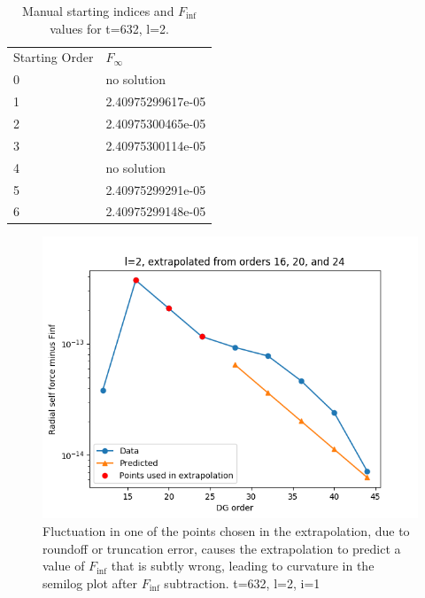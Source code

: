 \begin{table}
  \begin{tabular}{ll}
    Starting Order & $F_\infty$\\
    0 & no solution\\
    1 & 2.40975299617e-05\\
    2 & 2.40975300465e-05\\
    3 & 2.40975300114e-05\\
    4 & no solution\\
    5 & 2.40975299291e-05\\
    6 & 2.40975299148e-05\\
  \end{tabular}
  \caption{Manual starting indices and $F_{\inf}$ values for t=632, l=2.}
  \label{manual}
\end{table}

\begin{figure}
  \includegraphics{extrapolate7t632l2i1}
  \caption{Fluctuation in one of the points chosen in the extrapolation, due to roundoff or truncation error, causes the extrapolation to predict a value of $F_{\inf}$ that is subtly wrong, leading to curvature in the semilog plot after $F_{\inf}$ subtraction. t=632, l=2, i=1}
  \label{nosoln}
\end{figure}

